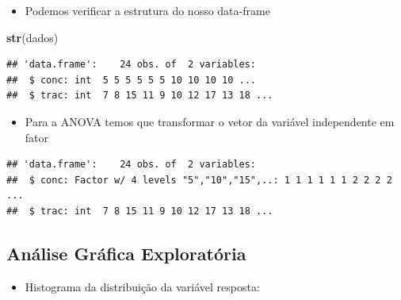 \documentclass[
]{book}
\newenvironment{Shaded}{\begin{snugshade}}{\end{snugshade}}
\newcommand{\FunctionTok}[1]{\textcolor[rgb]{0.13,0.29,0.53}{\textbf{#1}}}
\newcommand{\NormalTok}[1]{#1}
\newcommand{\OtherTok}[1]{\textcolor[rgb]{0.56,0.35,0.01}{#1}}
\newcommand{\SpecialCharTok}[1]{\textcolor[rgb]{0.81,0.36,0.00}{\textbf{#1}}}
\providecommand{\tightlist}{%
  \setlength{\itemsep}{0pt}\setlength{\parskip}{0pt}}
\begin{document}
\begin{itemize}
\tightlist
\item
  Podemos verificar a estrutura do nosso data-frame
\end{itemize}

\begin{Shaded}
\begin{Highlighting}[]
\FunctionTok{str}\NormalTok{(dados)}
\end{Highlighting}
\end{Shaded}

\begin{verbatim}
## 'data.frame':    24 obs. of  2 variables:
##  $ conc: int  5 5 5 5 5 5 10 10 10 10 ...
##  $ trac: int  7 8 15 11 9 10 12 17 13 18 ...
\end{verbatim}

\begin{itemize}
\tightlist
\item
  Para a ANOVA temos que transformar o vetor da variável independente em fator
\end{itemize}

\begin{Shaded}
\end{Shaded}

\begin{verbatim}
## 'data.frame':    24 obs. of  2 variables:
##  $ conc: Factor w/ 4 levels "5","10","15",..: 1 1 1 1 1 1 2 2 2 2 ...
##  $ trac: int  7 8 15 11 9 10 12 17 13 18 ...
\end{verbatim}

\subsection{Análise Gráfica Exploratória}\label{anuxe1lise-gruxe1fica-exploratuxf3ria}

\begin{itemize}
\tightlist
\item
  Histograma da distribuição da variável resposta:
\end{itemize}

\begin{Shaded}
\end{Shaded}
\end{document}
